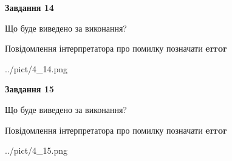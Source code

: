 \documentclass[11pt, ukrainian]{article}
\begin{document}
{\begin {large}
{\begin {center}\textbf{Завдання 14}\end {center}}\par
Що буде виведено за виконання? \par
Повідомлення інтерпретатора про помилку позначати \textbf{error}

\begin{center}
	{../pict/4_14.png}
\end{center}
\newpage

{\begin {center}\textbf{Завдання 15}\end {center}}\par
Що буде виведено за виконання? \par
Повідомлення інтерпретатора про помилку позначати \textbf{error}

\begin{center}
	{../pict/4_15.png}
\end{center}
\newpage

\end {large}}
\end{document}

